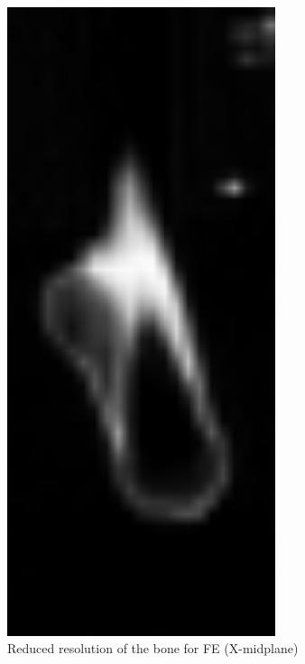 \documentclass[a4paper,12pt]{article}
\begin{document}
    \begin{figure}[htbp]
        \centering
        \begin{minipage}[b]{0.3\textwidth}
            \includegraphics[width=0.7\textwidth]{bone_low_res-XM}
            \caption{Reduced resolution of the bone for FE (X-midplane)}
            \label{fig:bone_low_res-XM}
        \end{minipage}
        \hfill
        \begin{minipage}[b]{0.3\textwidth}

\end{minipage}
\end{figure}
\end{document}
